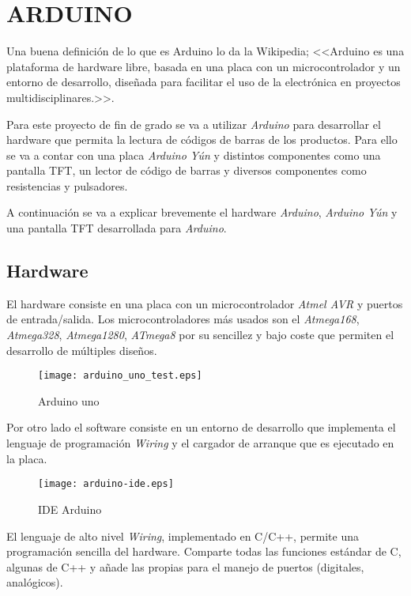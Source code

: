 \section{ARDUINO}

Una buena definición de lo que es Arduino lo da la Wikipedia; <<Arduino es una plataforma de hardware libre, basada en una placa con un microcontrolador y un entorno de desarrollo, diseñada para facilitar el uso de la electrónica en proyectos multidisciplinares.>>.

Para este proyecto de fin de grado se va a utilizar \emph{Arduino} para desarrollar el hardware que permita la lectura de códigos de barras de los productos. Para ello se va a contar con una placa \emph{Arduino Yún} y distintos componentes como una pantalla TFT, un lector de código de barras y diversos componentes como resistencias y pulsadores.

A continuación se va a explicar brevemente el hardware \emph{Arduino}, \emph{Arduino Yún} y una pantalla TFT desarrollada para \emph{Arduino}.

\subsection{Hardware}

El hardware consiste en una placa con un microcontrolador \emph{Atmel AVR} y puertos de entrada/salida. Los microcontroladores más usados son el \emph{Atmega168}, \emph{Atmega328}, \emph{Atmega1280}, \emph{ATmega8} por su sencillez y bajo coste que permiten el desarrollo de múltiples diseños.

\begin{figure}[h!]
    \centering
    \texttt{[image: arduino\_uno\_test.eps]}
    \caption{Arduino uno}\label{fig:arduino_uno_test}
\end{figure}


Por otro lado el software consiste en un entorno de desarrollo que implementa el lenguaje de programación \emph{Wiring} y el cargador de arranque que es ejecutado en la placa.

\begin{figure}[h!]
    \centering
    \texttt{[image: arduino-ide.eps]}
    \caption{IDE Arduino}\label{fig:arduino-ide}
\end{figure}

El lenguaje de alto nivel \emph{Wiring}, implementado en C/C++, permite una programación sencilla del hardware. Comparte todas las funciones estándar de C, algunas de C++ y añade las propias para el manejo de puertos (digitales, analógicos).


